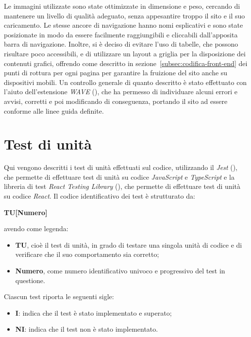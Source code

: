 Le immagini utilizzate sono state ottimizzate in dimensione e peso, cercando di mantenere un livello di qualità adeguato, senza appesantire troppo il sito e il suo caricamento.
Le stesse ancore di navigazione hanno nomi esplicativi e sono state posizionate in modo da essere facilmente raggiungibili e cliccabili dall'apposita barra di navigazione.
Inoltre, si è deciso di evitare l'uso di tabelle, che possono risultare poco accessibili, e di utilizzare un layout a griglia per la disposizione dei contenuti grafici, offrendo come descritto in sezione~\ref{subsec:codifica-front-end} dei punti di rottura per ogni pagina per garantire la fruizione del sito anche su dispositivi mobili.
Un controllo generale di quanto descritto è stato effettuato con l'aiuto dell'estensione \textit{WAVE} (\cite{site:wave}), che ha permesso di individuare alcuni errori e avvisi, corretti e poi modificando di conseguenza,
portando il sito ad essere conforme alle linee guida definite. 

\section{Test di unità}\label{sec:verifica-validazione-test}

Qui vengono descritti i test di unità effettuati sul codice, utilizzando il  \textit{Jest} (\cite{site:jest}), che permette di effettuare test di unità su codice \textit{JavaScript} e \textit{TypeScript}
e la libreria di test \textit{React Testing Library} (\cite{site:reacttestinglibrary}), che permette di effettuare test di unità su codice \textit{React}.
Il codice identificativo dei test è strutturato da:
\begin{center}
    \textbf{TU[Numero]}
  \end{center}
\textbf{}
avendo come legenda:
\begin{itemize}
\item \textbf{TU}, cioè il test di unità, in grado di testare una singola unità di codice e di verificare che il suo comportamento sia corretto;
\item \textbf{Numero}, come numero identificativo univoco e progressivo del test in questione.
\end{itemize}

Ciascun test riporta le seguenti sigle:
\begin{itemize}
\item \textbf{I}: indica che il test è stato implementato e superato;
\item \textbf{NI}: indica che il test non è stato implementato.
\end{itemize}


